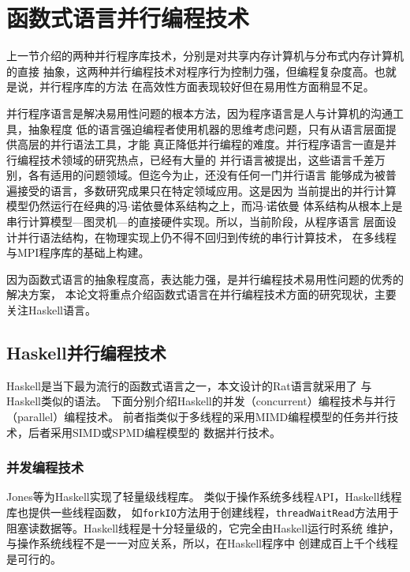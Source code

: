 \section{函数式语言并行编程技术}\label{sec:parallel-language}
上一节介绍的两种并行程序库技术，分别是对共享内存计算机与分布式内存计算机的直接
抽象，这两种并行编程技术对程序行为控制力强，但编程复杂度高。也就是说，并行程序库的方法
在高效性方面表现较好但在易用性方面稍显不足。

并行程序语言是解决易用性问题的根本方法，因为程序语言是人与计算机的沟通工具，抽象程度
低的语言强迫编程者使用机器的思维考虑问题，只有从语言层面提供高层的并行语法工具，才能
真正降低并行编程的难度。并行程序语言一直是并行编程技术领域的研究热点，已经有大量的
并行语言被提出，这些语言千差万别，各有适用的问题领域。但迄今为止，还没有任何一门并行语言
能够成为被普遍接受的语言，多数研究成果只在特定领域应用。这是因为
当前提出的并行计算模型仍然运行在经典的冯$\cdot{}$诺依曼体系结构之上，而冯$\cdot{}$诺依曼
体系结构从根本上是串行计算模型---图灵机---的直接硬件实现。所以，当前阶段，从程序语言
层面设计并行语法结构，在物理实现上仍不得不回归到传统的串行计算技术，
在多线程与MPI程序库的基础上构建。

因为函数式语言的抽象程度高，表达能力强，是并行编程技术易用性问题的优秀的解决方案，
本论文将重点介绍函数式语言在并行编程技术方面的研究现状，主要关注Haskell语言。

\subsection{Haskell并行编程技术}
Haskell是当下最为流行的函数式语言之一，本文设计的Rat语言就采用了
与Haskell类似的语法。
下面分别介绍Haskell的并发（concurrent）编程技术与并行（parallel）编程技术。
前者指类似于多线程的采用MIMD编程模型的任务并行技术，后者采用SIMD或SPMD编程模型的
数据并行技术。

\subsubsection{并发编程技术}
Jones等为Haskell实现了轻量级线程库。
类似于操作系统多线程API，Haskell线程库也提供一些线程函数，
如\texttt{forkIO}方法用于创建线程，\texttt{threadWaitRead}方法用于
阻塞读数据等。Haskell线程是十分轻量级的，它完全由Haskell运行时系统
维护，与操作系统线程不是一一对应关系，所以，在Haskell程序中
创建成百上千个线程是可行的。


